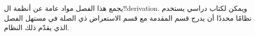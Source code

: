\documentclass[../../../include/open-logic-chapter]{subfiles}
\begin{document}
      {}
      {}

\begin{editorial}
يجمع هذا الفصل مواد عامة عن أنظمة ال!!{derivation}. ويمكن لكتاب دراسي
يستخدم نظامًا محددًا أن يدرج قسم المقدمة مع قسم الاستعراض ذي الصلة في
مستهل الفصل الذي يقدّم ذلك النظام.
\end{editorial}






\OLEndChapterHook
\end{document}
